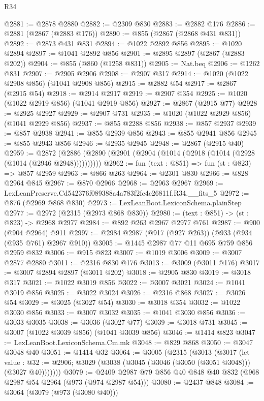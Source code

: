 \begin{lexlean}{R34}
\begin{coremodule}
@2881 := @2878 @2880
@2882 := @2309 @830
@2883 := @2882 @176
@2886 := @2881 (@2867 (@2883 @176))
@2890 := @855 (@2867 (@2868 @431 @831))
@2892 := @2873 @431 @831
@2894 := @1022 @2892 @856
@2895 := @1020 @2894
@2897 := @1041 @2892 @856
@2901 := @2895 @2897 (@2867 (@2883 @202))
@2904 := @855 (@860 (@1258 @831))
@2905 := Nat.beq
@2906 := @1262 @831
@2907 := @2905 @2906
@2908 := @2907 @317
@2914 := @1020 (@1022 @2908 @856) (@1041 @2908 @856)
@2915 := @2882 @54
@2917 := @2867 (@2915 @54)
@2918 := @2914 @2917
@2919 := @2907 @354
@2925 := @1020 (@1022 @2919 @856) (@1041 @2919 @856)
@2927 := @2867 (@2915 @77)
@2928 := @2925 @2927
@2929 := @2907 @731
@2935 := @1020 (@1022 @2929 @856) (@1041 @2929 @856)
@2937 := @855 @2288 @856
@2938 := @857 @2937
@2939 := @857 @2938
@2941 := @855 @2939 @856
@2943 := @855 @2941 @856
@2945 := @855 @2943 @856
@2946 := @2935 @2945
@2948 := @2867 (@2915 @40)
@2959 := @2872 (@2886 (@2890 (@2901 (@2904 (@1014 (@2918 (@1014 (@2928 (@1014 (@2946 @2948))))))))))
@2962 := fun (text : @851) => fun (st : @823) => @857 @2959
@2963 := @866 @263
@2964 := @2301 @830
@2966 := @828 @2964 @845
@2967 := @870 @2966
@2968 := @2963 @2967
@2969 := LexLeanPreserve.Cd542376f089388a4a783f2fc4c26811f.R34.__fits_5
@2972 := @876 (@2969 @868 @830)
@2973 := LexLeanBoot.LexiconSchema.plainStep
@2977 := @2972 (@2315 (@2973 @868 @830))
@2980 := (text : @851) -> (st : @823) -> @2968 @2977
@2984 := @892 @263 @2967 @2977 @761
@2987 := @900 (@904 @2964) @911
@2997 := @2984 @2987 (@917 (@927 @263)) (@933 (@934 (@935 @761) @2967 @910))
@3005 := @1445 @2987 @77 @11 @695 @759 @856 @2959 @832
@3006 := @915 @823
@3007 := @1019 @3006
@3009 := @3007 @2877 @2880
@3011 := @2316 @830 @176
@3013 := @3009 (@3011 @176)
@3017 := @3007 @2894 @2897 (@3011 @202)
@3018 := @2905 @830
@3019 := @3018 @317
@3021 := @1022 @3019 @856
@3022 := @3007 @3021
@3024 := @1041 @3019 @856
@3025 := @3022 @3024
@3026 := @2316 @868
@3027 := @3026 @54
@3029 := @3025 (@3027 @54)
@3030 := @3018 @354
@3032 := @1022 @3030 @856
@3033 := @3007 @3032
@3035 := @1041 @3030 @856
@3036 := @3033 @3035
@3038 := @3036 (@3027 @77)
@3039 := @3018 @731
@3045 := @3007 (@1022 @3039 @856) (@1041 @3039 @856)
@3046 := @1414 @823
@3047 := LexLeanBoot.LexiconSchema.Cm.mk
@3048 := @829 @868
@3050 := @3047 @3048 @40
@3051 := @1414 @32
@3064 := @3005
    (@2315
      (@3013
        (@3017
          (let value : @32 := @2906;
          @3029 (@3038 (@3045 (@3046 (@3050 (@3051 @3048))) (@3027 @40)))))))
@3079 := @2409 @2987 @79 @856 @40 @848 @40 @832 (@968 @2987 @54 @2964 (@973 (@974 @2987 @54)))
@3080 := @2437 @848
@3084 := @3064 (@3079 (@973 (@3080 @40)))

\end{coremodule}
\end{lexlean}
